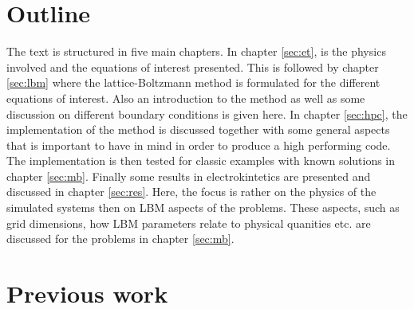 \section{Outline}
The text is structured in five main chapters. In chapter \ref{sec:et},
is the physics involved and the equations of interest presented. This
is followed by chapter \ref{sec:lbm} where the lattice-Boltzmann
method is formulated for the different equations of interest. Also an
introduction to the method as well as some discussion on different
boundary conditions is given here. In chapter \ref{sec:hpc}, the
implementation of the method is discussed together with some general
aspects that is important to have in mind in order to produce a high
performing code. The implementation is then tested for classic
examples with known solutions in chapter \ref{sec:mb}. Finally some
results in electrokintetics are presented and discussed in chapter
\ref{sec:res}. Here, the focus is rather on the physics of the
simulated systems then on LBM aspects of the problems. These aspects,
such as grid dimensions, how LBM parameters relate to physical
quanities etc. are discussed for the problems in chapter \ref{sec:mb}.

\section{Previous work}
